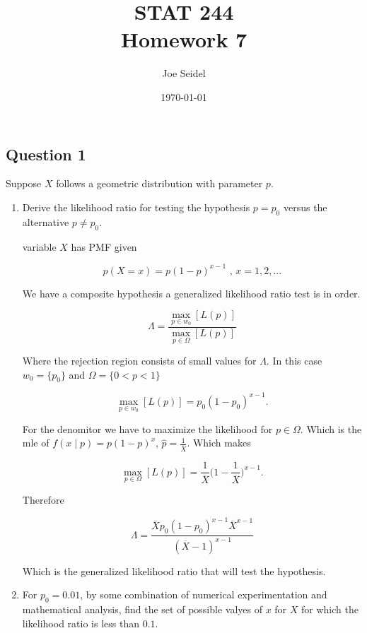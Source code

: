 \documentclass{tufte-book}
\title{STAT 244 \\ Homework 7}
\author{Joe Seidel}
\date{\today}
\theoremstyle{mytheoremstyle}
\theoremstyle{mylemstyle}
\theoremstyle{mydefstyle}
\begin{document}
\maketitle
{}
\newpage
{}

\subsection{Question 1}
Suppose $X$ follows a geometric distribution with parameter $p$.

\begin{enumerate}

\item Derive the likelihood ratio for testing the hypothesis $p=p_0$ versus the alternative $p \neq p_0$.

 variable $X$ has PMF given

\[ p(X=x) = p(1-p)^{x-1} \text{ , } x=1,2,... \]

We have a composite hypothesis a generalized likelihood ratio test is in order.

\[ \Lambda = \frac{\max_{p \in w_0}[L(p)]}{\max_{p \in \Omega}[L(p)]} \]

Where the rejection region consists of small values for $\Lambda$.  In this case $w_0 = \{p_0\}$ and $\Omega = \{ 0 < p < 1\}$

\[ \max_{p \in w_0}[L(p)] = p_0(1-p_0)^{x-1}. \]

For the denomitor we have to maximize the likelihood for $p \in \Omega$.  Which is the mle of $f(x \mid p) = p(1-p)^{x}$, $\hat{p} = \frac{1}{\overline{X}}$. Which makes

\[ \max_{p \in \Omega}[L(p)] = \frac{1}{\overline{X}}\Big(1-\frac{1}{\overline{X}}\Big)^{x-1}. \]

Therefore 

\[ \Lambda = \frac{\overline{X} p_0(1-p_0)^{x-1}\overline{X}^{x-1}}{(\overline{X}-1)^{x-1}} \]

Which is the generalized likelihood ratio that will test the hypothesis.

\item For $p_0=0.01$, by some combination of numerical experimentation and mathematical analysis, find the set of possible valyes of $x$ for $X$ for which the likelihood ratio is less than $0.1$.


\end{enumerate}
\end{document}
